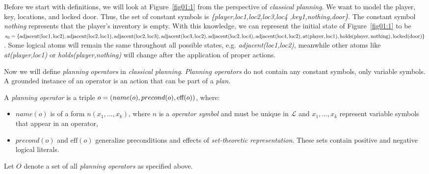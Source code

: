 \begin{example}\label{ex01:3}
    Before we start with definitions, we will look at Figure~\ref{fig01:1} from the perspective of \emph{classical planning}. We want to model the player, key, locations, and locked door. Thus, the set of constant symbols is \emph{\{player,loc1,loc2,loc3,loc4} \emph{,key1,nothing,door\}}. The constant symbol \emph{nothing} represents that the player's inventory is empty. With this knowledge, we can represent the initial state of Figure~\ref{fig01:1} to be $s_0=\{\mathrm{adjacent(loc1,loc2)},\mathrm{adjacent(loc2,loc1)},\mathrm{adjacent(loc2,loc3)}, \\ \mathrm{adjacent(loc3,loc2)}, \mathrm{adjacent(loc2,loc4)},\mathrm{adjacent(loc4,loc2)}, \mathrm{at(player,loc1)}, \\ \mathrm{holds(player,nothing)}, \mathrm{locked(door)}\}$. Some logical atoms will remain the same throughout all possible states, e.g. \emph{adjacent(loc1,loc2)}, meanwhile other atoms like \emph{at(player,loc1)} or \emph{holds(player,nothing)} will change after the application of proper actions.
\end{example}

\medskip\noindent
Now we will define \emph{planning operators} in \emph{classical planning}. \emph{Planning operators} do not contain any constant symbols, only variable symbols. A grounded instance of an operator is an action that can be part of a \emph{plan}.

\pagebreak

\begin{defn}\label{def01:5}
    A \emph{planning operator} is a triple $o = (name(o),precond(o), \\ \text{eff}(o))$, where:

        \begin{itemize}
            \item $name(o)$ is of a form $n(x_1,\dots,x_k)$, where $n$ is a \emph{operator symbol} and must be unique in $\mathcal{L}$ and $x_1,\dots,x_k$ represent variable symbols that appear in an operator,

            \item $precond(o)$ and $\text{eff}(o)$ generalize preconditions and effects of \emph{set-theoretic representation}. These sets contain positive and negative logical literals.
        \end{itemize}

    Let $O$ denote a set of all \emph{planning operators} as specified above.
\end{defn}


